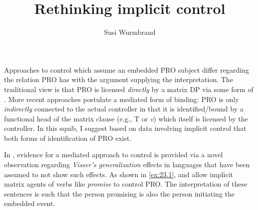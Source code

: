 \documentclass[output=paper]{langsci/langscibook}
\author{Susi Wurmbrand\affiliation{University of Vienna}}
\title{Rethinking implicit control}
\begin{document}
\glsresetall
\maketitle

\noindent Approaches to control which assume an embedded PRO subject differ
regarding the relation PRO has with the argument supplying the interpretation.
The traditional view is that PRO is licensed \emph{directly} by a matrix DP via
some form of . More recent approaches postulate a mediated form of
binding: PRO is only \emph{indirectly} connected to the actual controller in
that it is identified/bound by a functional head of the matrix clause (e.g., T
or \emph{v}) which itself is licensed by the controller. In this squib, I
suggest based on data involving implicit control that both forms of
identification of PRO exist.

In \textcite{vanUrk2013}, evidence for a mediated approach to control is
provided via a novel observation regarding \emph{Visser’s generalization}
effects in languages that have been assumed to not show such effects. As shown
in \eqref{ex:23.1},  and  allow implicit matrix
agents of verbs like \emph{promise} to control PRO. The interpretation of these
sentences is such that the person promising is also the person initiating the
embedded event.\newpage
\end{document}
